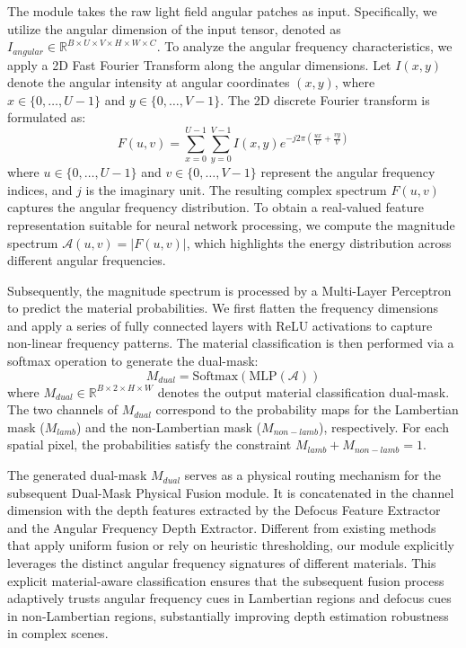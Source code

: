 The module takes the raw light field angular patches as input. Specifically, we utilize the angular dimension of the input tensor, denoted as $I_{angular} \in \mathbb{R}^{B \times U \times V \times H \times W \times C}$. To analyze the angular frequency characteristics, we apply a 2D Fast Fourier Transform along the angular dimensions. Let $I(x, y)$ denote the angular intensity at angular coordinates $(x, y)$, where $x \in \{0, \dots, U-1\}$ and $y \in \{0, \dots, V-1\}$. The 2D discrete Fourier transform is formulated as:
\begin{equation}
\label{eq:eq16}
F(u,v) = \sum_{x=0}^{U-1}\sum_{y=0}^{V-1} I(x,y) e^{-j2\pi\left(\frac{ux}{U} + \frac{vy}{V}\right)}
\end{equation}
where $u \in \{0, \dots, U-1\}$ and $v \in \{0, \dots, V-1\}$ represent the angular frequency indices, and $j$ is the imaginary unit. The resulting complex spectrum $F(u,v)$ captures the angular frequency distribution. To obtain a real-valued feature representation suitable for neural network processing, we compute the magnitude spectrum $\mathcal{A}(u,v) = |F(u,v)|$, which highlights the energy distribution across different angular frequencies. 

Subsequently, the magnitude spectrum is processed by a Multi-Layer Perceptron to predict the material probabilities. We first flatten the frequency dimensions and apply a series of fully connected layers with ReLU activations to capture non-linear frequency patterns. The material classification is then performed via a softmax operation to generate the dual-mask:
\begin{equation}
\label{eq:eq17}
M_{dual} = \text{Softmax}(\text{MLP}(\mathcal{A}))
\end{equation}
where $M_{dual} \in \mathbb{R}^{B \times 2 \times H \times W}$ denotes the output material classification dual-mask. The two channels of $M_{dual}$ correspond to the probability maps for the Lambertian mask ($M_{lamb}$) and the non-Lambertian mask ($M_{non-lamb}$), respectively. For each spatial pixel, the probabilities satisfy the constraint $M_{lamb} + M_{non-lamb} = 1$.

The generated dual-mask $M_{dual}$ serves as a physical routing mechanism for the subsequent Dual-Mask Physical Fusion module. It is concatenated in the channel dimension with the depth features extracted by the Defocus Feature Extractor and the Angular Frequency Depth Extractor. Different from existing methods that apply uniform fusion or rely on heuristic thresholding, our module explicitly leverages the distinct angular frequency signatures of different materials. This explicit material-aware classification ensures that the subsequent fusion process adaptively trusts angular frequency cues in Lambertian regions and defocus cues in non-Lambertian regions, substantially improving depth estimation robustness in complex scenes.

